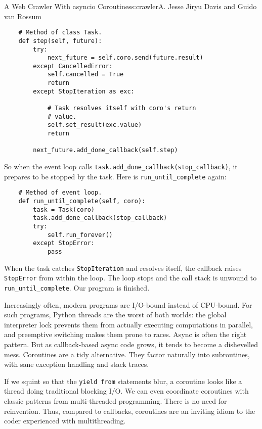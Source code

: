 \begin{aosachapter}{A Web Crawler With asyncio Coroutines}{s:crawler}{A. Jesse Jiryu Davis and Guido van Rossum}
\begin{verbatim}
    # Method of class Task.
    def step(self, future):
        try:
            next_future = self.coro.send(future.result)
        except CancelledError:
            self.cancelled = True
            return
        except StopIteration as exc:

            # Task resolves itself with coro's return
            # value.
            self.set_result(exc.value)
            return

        next_future.add_done_callback(self.step)
\end{verbatim}

So when the event loop calls
\texttt{task.add\_done\_callback(stop\_callback)}, it prepares to be
stopped by the task. Here is \texttt{run\_until\_complete} again:

\begin{verbatim}
    # Method of event loop.
    def run_until_complete(self, coro):
        task = Task(coro)
        task.add_done_callback(stop_callback)
        try:
            self.run_forever()
        except StopError:
            pass
\end{verbatim}

When the task catches \texttt{StopIteration} and resolves itself, the
callback raises \texttt{StopError} from within the loop. The loop stops
and the call stack is unwound to \texttt{run\_until\_complete}. Our
program is finished.

\label{conclusion}

Increasingly often, modern programs are I/O-bound instead of CPU-bound.
For such programs, Python threads are the worst of both worlds: the
global interpreter lock prevents them from actually executing
computations in parallel, and preemptive switching makes them prone to
races. Async is often the right pattern. But as callback-based async
code grows, it tends to become a dishevelled mess. Coroutines are a tidy
alternative. They factor naturally into subroutines, with sane exception
handling and stack traces.

If we squint so that the \texttt{yield from} statements blur, a
coroutine looks like a thread doing traditional blocking I/O. We can
even coordinate coroutines with classic patterns from multi-threaded
programming. There is no need for reinvention. Thus, compared to
callbacks, coroutines are an inviting idiom to the coder experienced
with multithreading.


\end{aosachapter}
